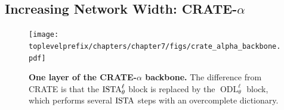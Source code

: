 \documentclass[../../book-main.tex]{subfiles}
\begin{document}
\subsection{Increasing Network Width: CRATE-\texorpdfstring{\(\alpha\)}{alpha}}\label{sub:crate_alpha_experiments}

\begin{figure}[t]
    \centering 
    \texttt{[image: \\toplevelprefix/chapters/chapter7/figs/crate\_alpha\_backbone.pdf]}
    \caption{\small\textbf{One layer of the CRATE-\(\alpha\) backbone.} The difference from CRATE is that the \(\operatorname{ISTA}_{\theta}^{\ell}\) block is replaced by the \(\operatorname{ODL}_{\theta}^{\ell}\) block, which performs several \(\operatorname{ISTA}\) steps with an overcomplete dictionary.}
    \label{fig:crate_alpha_backbone}
\end{figure}
\end{document}
